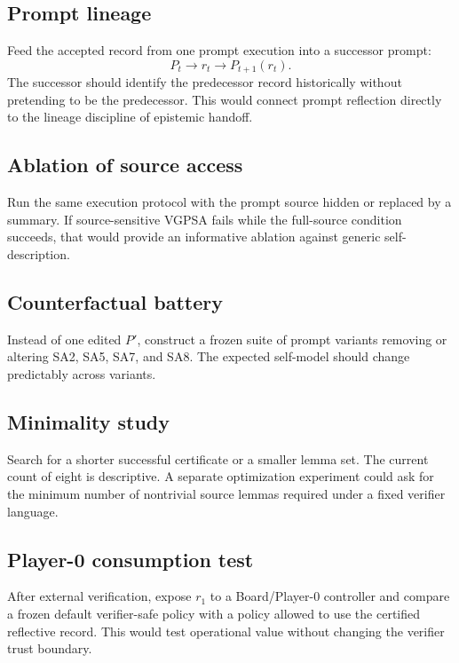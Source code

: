 \documentclass[11pt]{article}
\theoremstyle{remark}
\begin{document}
\subsection{Prompt lineage}
Feed the accepted record from one prompt execution into a successor prompt:
\[
P_t\longrightarrow r_t\longrightarrow P_{t+1}(r_t).
\]
The successor should identify the predecessor record historically without pretending to be the predecessor. This would connect prompt reflection directly to the lineage discipline of epistemic handoff.

\subsection{Ablation of source access}
Run the same execution protocol with the prompt source hidden or replaced by a summary. If source-sensitive VGPSA fails while the full-source condition succeeds, that would provide an informative ablation against generic self-description.

\subsection{Counterfactual battery}
Instead of one edited $P'$, construct a frozen suite of prompt variants removing or altering SA2, SA5, SA7, and SA8. The expected self-model should change predictably across variants.

\subsection{Minimality study}
Search for a shorter successful certificate or a smaller lemma set. The current count of eight is descriptive. A separate optimization experiment could ask for the minimum number of nontrivial source lemmas required under a fixed verifier language.

\subsection{Player-0 consumption test}
After external verification, expose $r_1$ to a Board/Player-0 controller and compare a frozen default verifier-safe policy with a policy allowed to use the certified reflective record. This would test operational value without changing the verifier trust boundary.
\end{document}
